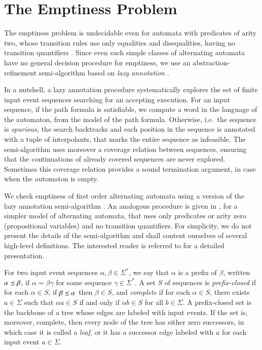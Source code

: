 \section{The Emptiness Problem}
\label{sec:emptiness}

The emptiness problem is undecidable even for automata with predicates
of arity two, whose transition rules use only equalities and
disequalities, having no transition quantifiers \cite{Farzan15}. Since
even such simple classes of alternating automata have no general
decision procedure for emptiness, we use an abstraction-refinement
semi-algorithm based on \emph{lazy annotation}
\cite{McMillan06,McMillan14}.

In a nutshell, a lazy annotation procedure systematically explores the
set of finite input event sequences searching for an accepting
execution. For an input sequence, if the path formula is satisfiable,
we compute a word in the language of the automaton, from the model of
the path formula. Otherwise, i.e.\ the sequence is \emph{spurious},
the search backtracks and each position in the sequence is annotated
with a tuple of interpolants, that marks the entire sequence as
infeasible. The semi-algorithm uses moreover a coverage relation
between sequences, ensuring that the continuations of already covered
sequences are never explored. Sometimes this coverage relation
provides a sound termination argument, in case when the automaton is
empty.

We check emptiness of first order alternating automata using a version
of the \impact~ lazy annotation semi-algorithm \cite{McMillan06}. An
analogous procedure is given in \cite{IosifXu18}, for a simpler model
of alternating automata, that uses only predicates or arity zero
(propositional variables) and no transition quantifiers. For
simplicity, we do not present the details of the semi-algorithm and
shall content ourselves of several high-level definitions. The
interested reader is referred to \cite{IosifXu18} for a detailed
presentation.

For two input event sequences $\alpha, \beta \in \Sigma^*$, we say
that $\alpha$ is a prefix of $\beta$, written $\alpha \preceq \beta$,
if $\alpha=\beta\gamma$ for some sequence $\gamma\in\Sigma^*$. A set
$S$ of sequences is \emph{prefix-closed} if for each $\alpha \in S$,
if $\beta \preceq \alpha$ then $\beta \in S$, and \emph{complete} if
for each $\alpha \in S$, there exists $a \in \Sigma$ such that $\alpha
a \in S$ if and only if $\alpha b \in S$ for all $b \in \Sigma$. A
prefix-closed set is the backbone of a tree whose edges are labeled
with input events. If the set is, moreover, complete, then every node
of the tree has either zero successors, in which case it is called a
\emph{leaf}, or it has a successor edge labeled with $a$ for each
input event $a \in \Sigma$.

